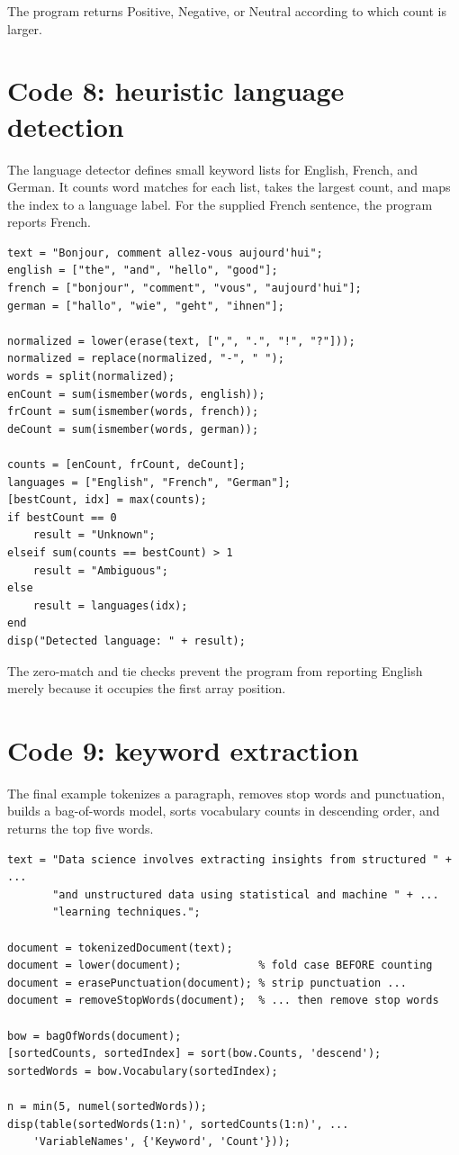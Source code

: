 The program returns Positive, Negative, or Neutral according to which count is larger.

\section{Code 8: heuristic language detection}

The language detector defines small keyword lists for English, French, and German. It counts word matches for each list, takes the largest count, and maps the index to a language label. For the supplied French sentence, the program reports French.

\begin{lstlisting}[style=mlmatlab]
text = "Bonjour, comment allez-vous aujourd'hui";
english = ["the", "and", "hello", "good"];
french = ["bonjour", "comment", "vous", "aujourd'hui"];
german = ["hallo", "wie", "geht", "ihnen"];

normalized = lower(erase(text, [",", ".", "!", "?"]));
normalized = replace(normalized, "-", " ");
words = split(normalized);
enCount = sum(ismember(words, english));
frCount = sum(ismember(words, french));
deCount = sum(ismember(words, german));

counts = [enCount, frCount, deCount];
languages = ["English", "French", "German"];
[bestCount, idx] = max(counts);
if bestCount == 0
    result = "Unknown";
elseif sum(counts == bestCount) > 1
    result = "Ambiguous";
else
    result = languages(idx);
end
disp("Detected language: " + result);
\end{lstlisting}

The zero-match and tie checks prevent the program from reporting English merely because it occupies the first array position.

\section{Code 9: keyword extraction}

The final example tokenizes a paragraph, removes stop words and punctuation, builds a bag-of-words model, sorts vocabulary counts in descending order, and returns the top five words.

\begin{lstlisting}[style=mlmatlab]
text = "Data science involves extracting insights from structured " + ...
       "and unstructured data using statistical and machine " + ...
       "learning techniques.";

document = tokenizedDocument(text);
document = lower(document);            % fold case BEFORE counting
document = erasePunctuation(document); % strip punctuation ...
document = removeStopWords(document);  % ... then remove stop words

bow = bagOfWords(document);
[sortedCounts, sortedIndex] = sort(bow.Counts, 'descend');
sortedWords = bow.Vocabulary(sortedIndex);

n = min(5, numel(sortedWords));
disp(table(sortedWords(1:n)', sortedCounts(1:n)', ...
    'VariableNames', {'Keyword', 'Count'}));
\end{lstlisting}

